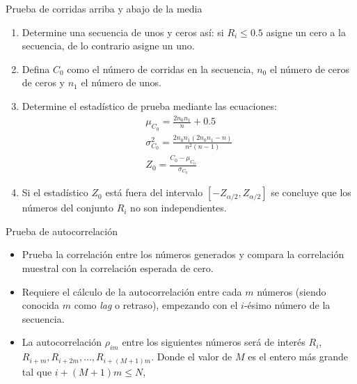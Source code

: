 \begin{frame}{Prueba de corridas arriba y abajo de la media}
    \begin{enumerate}
        \item Determine una secuencia de unos y ceros así: si $R_{i}\leq 0.5$ asigne un cero a la secuencia, de lo contrario asigne un uno.
        \item Defina $C_0$ como el número de corridas en la secuencia, $n_0$ el número de ceros de ceros y $n_1$ el número de unos.
        \item Determine el estadístico de prueba mediante las ecuaciones:
            \begin{eqnarray*}
                \mu_{C_0}=\frac{2n_0n_1}{n}+0.5 \\
                \sigma^2_{C_0}=\frac{2n_0n_1(2n_0n_1-n)}{n^2(n-1)}\\
                Z_0=\frac{C_0-\mu_{C_0}}{\sigma_{C_0}}
            \end{eqnarray*}
        \item Si el estadístico $Z_0$ está fuera del intervalo $\left[-Z_{\alpha/2}, Z_{\alpha/2}\right]$ se concluye que los números del conjunto $R_i$ no son independientes.
    \end{enumerate}
\end{frame}


\begin{frame}{Prueba de autocorrelación}
    \begin{itemize}
        \item Prueba la correlación entre los números generados y compara la correlación muestral con la correlación esperada de cero.
        
        \item Requiere el cálculo de la autocorrelación entre cada $m$ números (siendo conocida $m$ como \textit{lag} o retraso), empezando con el $i$-ésimo número de la secuencia.
        
        \item La autocorrelación $\rho_{im}$  entre los siguientes números será de interés $R_i$, $R_{i+m}, R_{i+2m},\dots, R_{i+(M+1)m}$. Donde el valor de $M$ es el entero más grande tal que $i+(M+1)m\leq N$,

    \end{itemize}
    
\end{frame}

